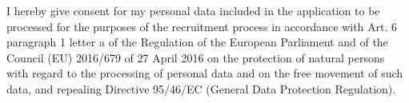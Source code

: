\documentclass[10pt,a4paper,ragged2e]{altacv}
\begin{document}
\vfill
\begin{fullwidth}
\footnotesize{I hereby give consent for my personal data included in the application to be
processed for the purposes of the recruitment process in accordance with Art. 6 paragraph 1
letter a of the Regulation of the European Parliament and of the Council (EU) 2016/679 of 27
April 2016 on the protection of natural persons with regard to the processing of personal data
and on the free movement of such data, and repealing Directive 95/46/EC (General Data
Protection Regulation).}
\end{fullwidth}

\clearpage

\nocite{*}

\end{document}
